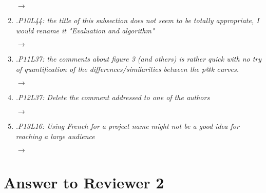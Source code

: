 \documentclass[10pt]{article}
\begin{document}
\begin{enumerate}
$\rightarrow$

\item \emph{.P10L44: the title of this subsection does not seem to be totally appropriate, I would rename it "Evaluation and algorithm"}

$\rightarrow$

\item \emph{.P11L37: the comments about figure 3 (and others) is rather quick with no try of quantification of the differences/similarities between the p@k curves.}

$\rightarrow$

\item \emph{.P12L37: Delete the comment addressed to one of the authors}

$\rightarrow$

\item \emph{.P13L16: Using French for a project name might not be a good idea for reaching a large audience}

$\rightarrow$

\end{enumerate}

\section{Answer to Reviewer 2}
\end{document}
